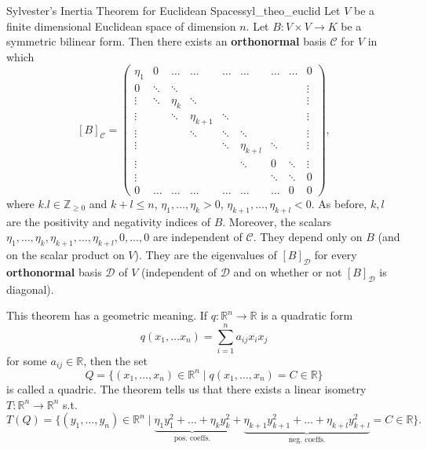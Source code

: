 \begin{theorem}{Sylvester's Inertia Theorem for Euclidean Spaces}{syl_theo_euclid}
	Let $V$ be a finite dimensional Euclidean space of dimension $n$. Let $B:V \times V \to K$ be a symmetric bilinear form. Then there exists an \textbf{orthonormal} basis $\mathcal{C}$ for $V$ in which
	\[
		[B]_{\mathcal{C}} = 
		\begin{pmatrix}
			\eta_1 & 0 & \hdots & \hdots &\hdots &\hdots &\hdots &\hdots & 0\\
			0 & \ddots & \ddots & & & & & & \vdots\\
			\vdots & \ddots & \eta_k & \ddots & & & & & \vdots\\
			\vdots & & \ddots & \eta_{k+1} & \ddots & & & & \vdots\\
			\vdots & & &\ddots & \ddots & \ddots & & & \vdots\\
			\vdots & & & & \ddots & \eta_{k+l} & \ddots & & \vdots\\
			\vdots & & & & & \ddots &0 & \ddots &  \vdots \\
			\vdots & & & & & & \ddots & \ddots & 0\\
			0 & \hdots &\hdots &\hdots &\hdots &\hdots &\hdots & 0 &0
		\end{pmatrix},
	\]
	where $k.l \in \mathbb{Z}_{\geq 0}$ and $k + l \leq n$, $\eta_1, \hdots , \eta_k > 0$, $\eta_{k+1}, \hdots , \eta_{k+l} < 0$. As before, $k,l$ are the positivity and negativity indices of $B$. Moreover, the scalars $\eta_1, \hdots , \eta_k, \eta_{k+1}, \hdots , \eta_{k+l}, 0 , \hdots , 0$ are independent of $\mathcal{C}$. They depend only on $B$ (and on the scalar product on $V$). They are the eigenvalues of $[B]_{\mathcal{D}}$ for every \textbf{orthonormal} basis $\mathcal{D}$ of $V$ (independent of $\mathcal{D}$ and on whether or not $[B]_{\mathcal{D}}$ is diagonal).
\end{theorem}

\begin{remark}
	This theorem has a geometric meaning. If $q:\mathbb{R}^n \to \mathbb{R}$ is a quadratic form
	\[
		q(x_1, \hdots x_n) = \sum_{i=1}^{n} a_{ij} x_i x_j
	\]
	for some $a_{ij} \in \mathbb{R}$, then the set 
	\[
		Q = \{(x_1, \hdots , x_n) \in \mathbb{R}^n \;|\; q(x_1, \hdots , x_n) = C \in \mathbb{R}\}
	\]
	is called a quadric. The theorem tells us that there exists a linear isometry $T:\mathbb{R}^n \to \mathbb{R}^n$ s.t.
	\[
		T(Q) = \{(y_1, \hdots , y_n) \in \mathbb{R}^n \;|\; \underbrace{\eta_1 y_1^2 + \hdots + \eta_k y_k^2}_{\displaystyle \text{pos. coeffs.}} + \underbrace{\eta_{k+1}y_{k+1}^2 + \hdots + \eta_{k+l}y_{k+l}^2}_{\displaystyle \text{neg. coeffs.}} = C \in \mathbb{R} \}.
	\]
\end{remark}


